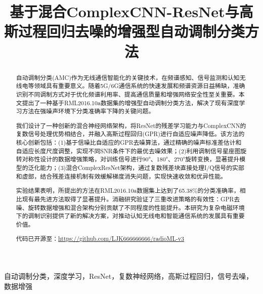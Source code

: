 \documentclass[conference]{IEEEtran}
\begin{document}
\title{基于混合ComplexCNN-ResNet与高斯过程回归去噪的增强型自动调制分类方法}

\author{
}

\maketitle

\begin{abstract}
自动调制分类(AMC)作为无线通信智能化的关键技术，在频谱感知、信号监测和认知无线电等领域具有重要意义。随着5G/6G通信系统的快速发展和频谱资源日益稀缺，准确识别不同调制方式对于优化频谱利用率、提高通信质量和增强网络安全性至关重要。本文提出了一种基于RML2016.10a数据集的增强型自动调制分类方法，解决了现有深度学习方法在强噪声环境下分类准确率下降的关键问题。

我们设计了一种创新的混合神经网络架构，将ResNet的残差学习能力与ComplexCNN的复数信号处理优势相结合，并融入高斯过程回归(GPR)进行自适应噪声降低。该方法的核心创新包括：(1)基于信噪比自适应的GPR去噪算法，通过精确的噪声标准差估计和自适应长度尺度调整，实现不同SNR条件下的最优去噪效果；(2)利用调制信号星座图旋转对称性设计的数据增强策略，对训练信号进行90°、180°、270°旋转变换，显著提升模型的泛化能力；(3)混合ComplexResNet架构，通过复数残差块直接处理I/Q信号的实部和虚部，结合残差连接机制有效缓解梯度消失问题，实现快速收敛和优异性能。

实验结果表明，所提出的方法在RML2016.10a数据集上达到了65.38\%的分类准确率，相比现有最先进方法取得了显著提升。消融研究验证了三重改进策略的有效性：GPR去噪、旋转数据增强和混合架构分别贡献了不同程度的性能提升。本研究为复杂电磁环境下的调制识别提供了新的解决方案，对推动认知无线电和智能通信系统的发展具有重要价值。

代码已开源至：\url{https://github.com/LJK666666666/radioML-v3}
\end{abstract}

\begin{IEEEkeywords}
自动调制分类，深度学习，ResNet，复数神经网络，高斯过程回归，信号去噪，数据增强
\end{IEEEkeywords}
\end{document}
